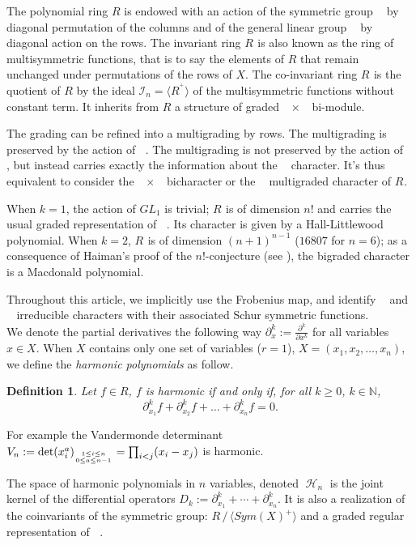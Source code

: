 \documentclass[letter,12pt]{article}
\newcommand{\NN}{\mathbb{N}}
\DeclareMathOperator{\Sn}{\mathbb{S}_n}
\DeclareMathOperator{\GLr}{GL_r}
\DeclareMathOperator{\harmonics}{\mathcal{H}}
\newtheorem{definition}{Definition}
\begin{document}
	The polynomial ring $R$ is endowed with an action of the symmetric group $\Sn$ by diagonal permutation of the columns and of the general linear group $\GLr$ by diagonal action on the rows. The invariant ring $R^{\Sn}$ is also known as the ring of multisymmetric functions, that is to say the elements of $R$ that remain unchanged under permutations of the rows of $X$. The co-invariant ring $R_{\Sn}$ is the quotient of $R$ by the ideal $\mathcal{I}_n = \langle {R^{\Sn^+}} \rangle$ of the multisymmetric functions without constant term. It inherits from $R$ a structure of graded $\GLr \times \Sn$ bi-module.
	
	The grading can be refined into a multigrading by rows. The multigrading is preserved by the action of $\Sn$. The multigrading is not preserved by the action of $\GLr$, but instead carries exactly the information about the $\GLr$ character. It's thus equivalent to consider the $\GLr \times \Sn$ bicharacter or the $\Sn$ multigraded character of $R_{\Sn}$.
	
	When $k=1$, the action of $GL_1$ is trivial; $R_{\Sn}$ is of dimension $n!$ and carries the usual graded representation of $\Sn$. Its character is given by a Hall-Littlewood polynomial.
	When $k=2$, $R_{\Sn}$ is of dimension $(n+1)^{n-1}$ ($16807$ for $n=6$); as a consequence of Haiman's proof of the $n!$-conjecture (see \cite{Haiman2002}), the bigraded character is a Macdonald polynomial.
	
	Throughout this article, we implicitly use the Frobenius map, and identify $\Sn$ and $\GLr$ irreducible characters with their associated Schur symmetric functions. \\
	
	We denote the partial derivatives the following way $\partial^k_x := \frac{\partial^k}{\partial x^k}$ for all variables $x \in X$.
	When $X$ contains only one set of variables ($r=1$), $X = (x_1, x_2, \dots, x_n)$, we define the \emph{harmonic polynomials} as follow.
	
	\begin{definition}
		Let $f \in R$, $f$ is \emph{harmonic} if and only if, for all $k \geq 0$, $k \in \NN$,
		$$\partial^k_{x_1} f + \partial^k_{x_2} f + \dots + \partial^k_{x_n} f = 0.$$
	\end{definition}

	For example the Vandermonde determinant $V_n:= \det(x_i^a)_{1 \leq i \leq n \atop 0 \leq a \leq n-1} = \prod_{i<j}(x_i-x_j)$ is harmonic. 

	The space of harmonic polynomials in $n$ variables, denoted $\harmonics_{n}$ is the joint kernel of the differential operators $D_k := \partial_{x_1}^k + \cdots + \partial_{x_n}^k$. It is also a realization of the coinvariants of the symmetric group: $R\, /\, \langle Sym(X)^+ \rangle$ and a graded regular representation of $\Sn$. 
	
\end{document}
